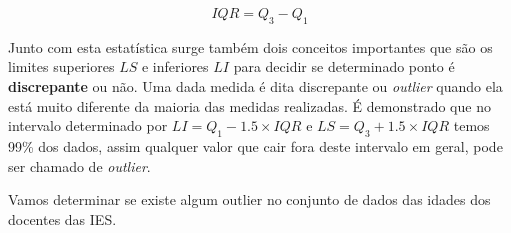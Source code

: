 \documentclass[12pt,]{style/krantz}
\makeatletter
\newenvironment{Shaded}{\begin{snugshade}}{\end{snugshade}}
\newcommand{\KeywordTok}[1]{\textcolor[rgb]{0.13,0.29,0.53}{\textbf{#1}}}
\newcommand{\DataTypeTok}[1]{\textcolor[rgb]{0.13,0.29,0.53}{#1}}
\newcommand{\DecValTok}[1]{\textcolor[rgb]{0.00,0.00,0.81}{#1}}
\newcommand{\FloatTok}[1]{\textcolor[rgb]{0.00,0.00,0.81}{#1}}
\newcommand{\StringTok}[1]{\textcolor[rgb]{0.31,0.60,0.02}{#1}}
\newcommand{\OtherTok}[1]{\textcolor[rgb]{0.56,0.35,0.01}{#1}}
\newcommand{\OperatorTok}[1]{\textcolor[rgb]{0.81,0.36,0.00}{\textbf{#1}}}
\newcommand{\NormalTok}[1]{#1}
\newenvironment{kframe}{%
\medskip{}
\setlength{\fboxsep}{.8em}
 \def\at@end@of@kframe{}%
 \ifinner\ifhmode%
  \def\at@end@of@kframe{\end{minipage}}%
  \begin{minipage}{\columnwidth}%
 \fi\fi%
 \def\FrameCommand##1{\hskip\@totalleftmargin \hskip-\fboxsep
 \colorbox{shadecolor}{##1}\hskip-\fboxsep
     \hskip-\linewidth \hskip-\@totalleftmargin \hskip\columnwidth}%
 \MakeFramed {\advance\hsize-\width
   \@totalleftmargin\z@ \linewidth\hsize
   \@setminipage}}%
 {\par\unskip\endMakeFramed%
 \at@end@of@kframe}
\renewenvironment{Shaded}{\begin{kframe}}{\end{kframe}}
\theoremstyle{definition}
\theoremstyle{definition}
\theoremstyle{definition}
\theoremstyle{remark}
\let\BeginKnitrBlock\begin \let\EndKnitrBlock\end
\makeatother
\begin{document}
\[IQR = Q_3-Q_1\]

Junto com esta estatística surge também dois conceitos importantes que
são os limites superiores \(LS\) e inferiores \(LI\) para decidir se
determinado ponto é \textbf{discrepante} ou não. Uma dada medida é dita
discrepante ou \emph{outlier} quando ela está muito diferente da maioria
das medidas realizadas. É demonstrado que no intervalo determinado por
\(LI=Q_1-1.5 \times IQR\) e \(LS=Q_3+1.5 \times IQR\) temos 99\% dos
dados, assim qualquer valor que cair fora deste intervalo em geral, pode
ser chamado de \emph{outlier}.

\BeginKnitrBlock{example}
\protect\hypertarget{exm:unnamed-chunk-68}{}{\label{exm:unnamed-chunk-68}
}Vamos determinar se existe algum outlier no conjunto de dados das
idades dos docentes das IES.
\EndKnitrBlock{example}

\begin{Shaded}
\end{Shaded}
\end{document}
